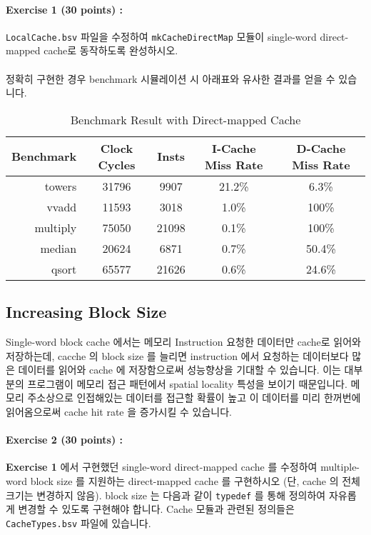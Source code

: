 \documentclass{article}
\begin{document}
\noindent \paragraph{\bf Exercise 1 (30 points) :} \texttt{LocalCache.bsv} 파일을 수정하여
\texttt{mkCacheDirectMap} 모듈이 single-word direct-mapped cache로 동작하도록 완성하시오.
\\\\
정확히 구현한 경우 benchmark 시뮬레이션 시 아래표와 유사한 결과를 얻을 수 있습니다. 

\begin{table}[h]
\centering
\begin{tabular}{|r|c|c|c|c|}
\hline
Benchmark & Clock Cycles & Insts & I-Cache Miss Rate & D-Cache Miss Rate \\
\hline
towers & 31796 & 9907 & 21.2\% & 6.3\% \\
 vvadd & 11593 & 3018 & 1.0\% & 100\% \\
multiply & 75050 & 21098 & 0.1\% & 100\%\\
  median & 20624 & 6871 & 0.7\% & 50.4\% \\
   qsort & 65577 & 21626 & 0.6\% & 24.6\% \\
\hline
\end{tabular}
\caption{Benchmark Result with Direct-mapped Cache}
\end{table}

\subsection{Increasing Block Size}
Single-word block cache 에서는 메모리 Instruction 요청한 데이터만 cache로 읽어와 저장하는데,
cacche 의 block size 를 늘리면 instruction 에서 요청하는 데이터보다 많은 데이터를 읽어와
cache 에 저장함으로써 성능향상을 기대할 수 있습니다.
이는 대부분의 프로그램이 메모리 접근 패턴에서 spatial locality 특성을 보이기 때문입니다.
메모리 주소상으로 인접해있는 데이터를 접근할 확률이 높고 이 데이터를 미리 한꺼번에 
읽어옴으로써 cache hit rate 을 증가시킬 수 있습니다.

\noindent \paragraph{\bf Exercise 2 (30 points) :} 
\textbf{Exercise 1} 에서 구현했던 single-word direct-mapped cache 를 수정하여
multiple-word block size 를 지원하는 direct-mapped cache 를 구현하시오
(단, cache 의 전체 크기는 변경하지 않음). block size 는 다음과 같이
\texttt{typedef} 를 통해 정의하여 자유롭게 변경할 수 있도록 구현해야 합니다.
Cache 모듈과 관련된 정의들은 \texttt{CacheTypes.bsv} 파일에 있습니다.
\end{document}
